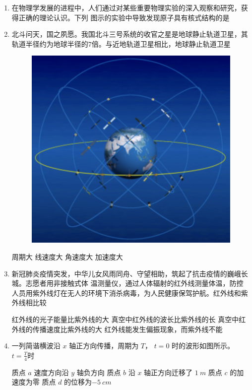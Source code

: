 




\begin{enumerate}
\item
在物理学发展的进程中，人们通过对某些重要物理实验的深入观察和研究，获得正确的理论认识。下列
图示的实验中导致发现原子具有核式结构的是  
\pfourchoices
{}
{}
{}
{}






\item
北斗问天，国之夙愿。我国北斗三号系统的收官之星是地球静止轨道卫星，其轨道半径约为地球半径的$ 7 $倍。与近地轨道卫星相比，地球静止轨道卫星  
\begin{figure}[h!]
\centering
\includegraphics[width=0.2\linewidth]{picture/screenshot053}
\end{figure}


\fourchoices
{周期大}
{线速度大}
{角速度大}
{加速度大}




\item
新冠肺炎疫情突发，中华儿女风雨同舟、守望相助，筑起了抗击疫情的巍峨长城。志愿者用非接触式体
温测量仪，通过人体辐射的红外线测量体温，防控人员用紫外线灯在无人的环境下消杀病毒，为人民健康保驾护航。红外线和紫外线相比较  

\fourchoices
{红外线的光子能量比紫外线的大}
{真空中红外线的波长比紫外线的长}
{真空中红外线的传播速度比紫外线的大}
{红外线能发生偏振现象，而紫外线不能}




\item
一列简谐横波沿 $ x $ 轴正方向传播，周期为 $ T $， $ t=0 $ 时的波形如图所示。 $ t=\frac{T}{4} $时  
\begin{figure}[h!]
\centering

\end{figure}

\fourchoices
{质点 $ a $ 速度方向沿 $ y $ 轴负方向}
{质点 $ b $ 沿 $ x $ 轴正方向迁移了 $ 1 \ m $}
{质点 $ c $ 的加速度为零}
{质点 $ d $ 的位移为$ -5 \ cm $}






\end{enumerate}
